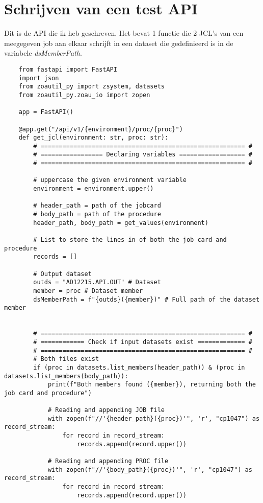 \section{Schrijven van een test API}
Dit is de API die ik heb geschreven. Het bevat 1 functie die 2 JCL's van een meegegeven job aan elkaar schrijft in een dataset die gedefinieerd is in de variabele \textit{dsMemberPath}. 
\begin{lstlisting}
    from fastapi import FastAPI
    import json
    from zoautil_py import zsystem, datasets
    from zoautil_py.zoau_io import zopen
    
    app = FastAPI()
    
    @app.get("/api/v1/{environment}/proc/{proc}")
    def get_jcl(environment: str, proc: str):
        # ======================================================== #
        # ================= Declaring variables ================== #
        # ======================================================== #
        
        # uppercase the given environment variable
        environment = environment.upper()
        
        # header_path = path of the jobcard
        # body_path = path of the procedure
        header_path, body_path = get_values(environment)
        
        # List to store the lines in of both the job card and procedure
        records = []
        
        # Output dataset
        outds = "AD12215.API.OUT" # Dataset
        member = proc # Dataset member
        dsMemberPath = f"{outds}({member})" # Full path of the dataset member
        
        
        # ======================================================== #
        # ============ Check if input datasets exist ============= #
        # ======================================================== #
        # Both files exist
        if (proc in datasets.list_members(header_path)) & (proc in datasets.list_members(body_path)):
            print(f"Both members found ({member}), returning both the job card and procedure")
        
            # Reading and appending JOB file
            with zopen(f"//'{header_path}({proc})'", 'r', "cp1047") as record_stream:
                for record in record_stream:
                    records.append(record.upper())
        
            # Reading and appending PROC file
            with zopen(f"//'{body_path}({proc})'", 'r', "cp1047") as record_stream:
                for record in record_stream:
                    records.append(record.upper())
        

\end{lstlisting}
